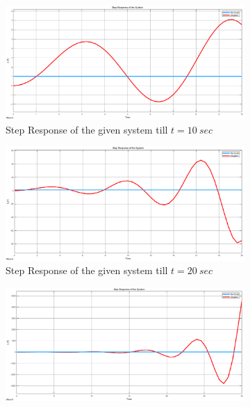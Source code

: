 \documentclass[a4paper,12pt]{article}
\begin{document}
\begin{enumerate}
\begin{enumerate}
		 \begin{figure}[H]
 			\setlength{\unitlength}{\textwidth} 
 			\centering
 			\begin{subfigure}{.5\textwidth}
   				\centering
   				\includegraphics[width=0.48\unitlength]{images/step}
   				\caption{\label{fig:s1} Step Response of the given system till $t=10\ sec$ }
 			\end{subfigure}%
 			\begin{subfigure}{.5\textwidth}
   				\centering
 				\includegraphics[width=0.48\unitlength]{images/step1}
   				\caption{\label{fig:s2} Step Response of the given system till $t=20\ sec$ }
 			\end{subfigure}
 			\begin{subfigure}{.5\textwidth}
 				\centering
 				\includegraphics[width=0.48\unitlength]{images/step2}

\end{subfigure}
\end{figure}
\end{enumerate}
\end{enumerate}
\end{document}
